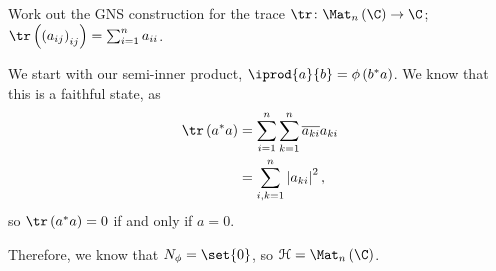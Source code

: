 \documentclass[10pt]{mypackage}
\begin{document}
\begin{exercise}
  Work out the GNS construction for the trace $\tr\colon \Mat_n\left(\C\right)\rightarrow \C$; $\tr\left(\left(a_{ij}\right)_{ij}\right) = \sum_{i=1}^{n}a_{ii}$.
\end{exercise}
\begin{solution}
  We start with our semi-inner product, $ \iprod{a}{b} = \phi\left(b^{\ast}a\right) $. We know that this is a faithful state, as
  \begin{align*}
    \tr\left(a^{\ast}a\right) &= \sum_{i=1}^{n}\sum_{k=1}^{n}\overline{a_{ki}}a_{ki}\\
                              &= \sum_{i,k=1}^{n}\left\vert a_{ki} \right\vert^2,
  \end{align*}
  so $\tr\left(a^{\ast}a\right) = 0$ if and only if $a = 0$.\newline

  Therefore, we know that $N_{\phi} = \set{0}$, so $\mathcal{H} = \Mat_n\left(\C\right)$.
\end{solution}
\end{document}
